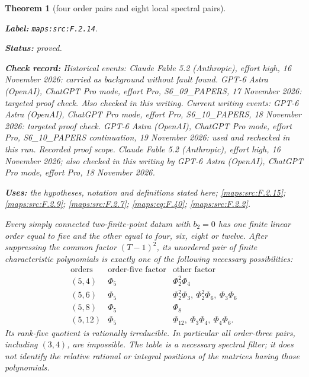 \documentclass[11pt,a4paper]{article}
\newtheorem{theorem}{Theorem}[section]
\theoremstyle{definition}
\newcommand{\StatementRecord}[4]{\par\smallskip\begingroup\upshape\raggedright\noindent\textbf{Label:} \nolinkurl{#1}.\par\noindent\textbf{Status:} #2.\par\noindent\textbf{Check record:} #3.\par\noindent\textbf{Uses:} #4.\par\endgroup\smallskip}
\begin{document}
\begin{theorem}[four order pairs and eight local spectral pairs]\label{maps:src:F.2.14}
\StatementRecord{maps:src:F.2.14}{proved}{Historical events: Claude Fable 5.2 (Anthropic), effort high, 16 November 2026: carried as background without fault found. GPT-6 Astra (OpenAI), ChatGPT Pro mode, effort Pro, S6\_09\_PAPERS, 17 November 2026: targeted proof check. Also checked in this writing. Current writing events: GPT-6 Astra (OpenAI), ChatGPT Pro mode, effort Pro, S6\_10\_PAPERS, 18 November 2026: targeted proof check. GPT-6 Astra (OpenAI), ChatGPT Pro mode, effort Pro, S6\_10\_PAPERS continuation, 19 November 2026: used and rechecked in this run. \emph{Recorded proof scope.} Claude Fable 5.2 (Anthropic), effort high, 16 November 2026; also checked in this writing by GPT-6 Astra (OpenAI), ChatGPT Pro mode, effort Pro, 18 November 2026}{the hypotheses, notation and definitions stated here; \cref{maps:src:F.2.15}; \cref{maps:src:F.2.9}; \cref{maps:src:F.2.7}; \cref{maps:eq:F.40}; \cref{maps:src:F.2.2}}


Every simply connected two-finite-point datum with $b_2=0$ has
one finite linear order equal to five and the other equal
to four, six, eight or twelve.
After suppressing the common factor $(T-1)^2$, its unordered
pair of finite characteristic polynomials is exactly one
of the following necessary possibilities:
\[
\begin{array}{c|c|l}
 \text{orders}&\text{order-five factor}&\text{other factor}\\\hline
 (5,4)&\Phi_5&\Phi_2^2\Phi_4\\
 (5,6)&\Phi_5&\Phi_2^2\Phi_3,\ \Phi_2^2\Phi_6,\ \Phi_3\Phi_6\\
 (5,8)&\Phi_5&\Phi_8\\
 (5,12)&\Phi_5&\Phi_{12},\ \Phi_3\Phi_4,\ \Phi_4\Phi_6.
\end{array}
 \tag{F.39}\label{maps:eq:F.39}
\]
Its rank-five quotient is rationally irreducible.
In particular all order-three pairs, including $(3,4)$,
are impossible.  The table is a necessary spectral filter;
it does not identify the relative rational or integral
positions of the matrices having those polynomials.

\end{theorem}
\end{document}
